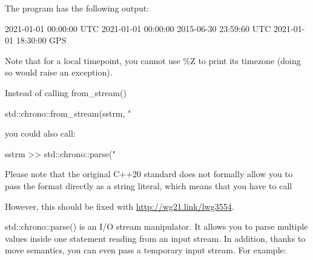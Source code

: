 

The program has the following output:

\begin{shell}
2021-01-01 00:00:00 UTC
2021-01-01 00:00:00
2015-06-30 23:59:60 UTC
2021-01-01 18:30:00 GPS
\end{shell}

Note that for a local timepoint, you cannot use \%Z to print its timezone (doing so would raise an exception).


Instead of calling from\_stream()

\begin{cpp}
std::chrono::from_stream(sstrm, "%
\end{cpp}

you could also call:

\begin{cpp}
sstrm >> std::chrono::parse("%
\end{cpp}

Please note that the original C++20 standard does not formally allow you to pass the format directly as a string literal, which means that you have to call


However, this should be fixed with \url{http://wg21.link/lwg3554}.

std::chrono::parse() is an I/O stream manipulator. It allows you to parse multiple values inside one statement reading from an input stream. In addition, thanks to move semantics, you can even pass a temporary input stream. For example:

